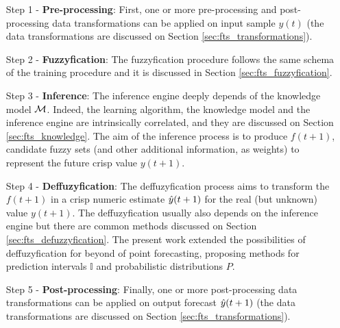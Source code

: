 \begin{enumerate}
    \item [Step 1] - \textbf{Pre-processing}: First, one or more pre-processing and post-processing data transformations can be applied on input sample $y(t)$ (the data transformations are discussed on Section \ref{sec:fts_transformations}).
    
    \item[Step 2] - \textbf{Fuzzyfication}: The fuzzyfication procedure follows the same schema of the training procedure and it is discussed in Section \ref{sec:fts_fuzzyfication}. 
    
    \item[Step 3] - \textbf{Inference}: The inference engine deeply depends of the knowledge model $\mathcal{M}$. Indeed, the learning algorithm, the knowledge model and the inference engine are intrinsically correlated, and they are discussed on Section \ref{sec:fts_knowledge}. The aim of the inference process is to produce $f(t+1)$, candidate fuzzy sets (and other additional information, as weights) to represent the future crisp value $y(t+1)$.
    
    \item[Step 4] - \textbf{Deffuzyfication}: The deffuzyfication process aims to transform the $f(t+1)$ in a crisp numeric estimate $\hat{y}(t+1)$ for the real (but unknown) value $y(t+1)$. The deffuzyfication usually also depends on the inference engine but there are common methods discussed on Section \ref{sec:fts_defuzzyfication}. The present work extended the possibilities of deffuzyfication for beyond of point forecasting, proposing methods for prediction intervals $\mathbb{I}$ and probabilistic distributions $P$.
    
    \item [Step 5] - \textbf{Post-processing}: Finally, one or more post-processing data transformations can be applied on output forecast $\hat{y}(t+1)$  (the data transformations are discussed on Section \ref{sec:fts_transformations}).
\end{enumerate}

